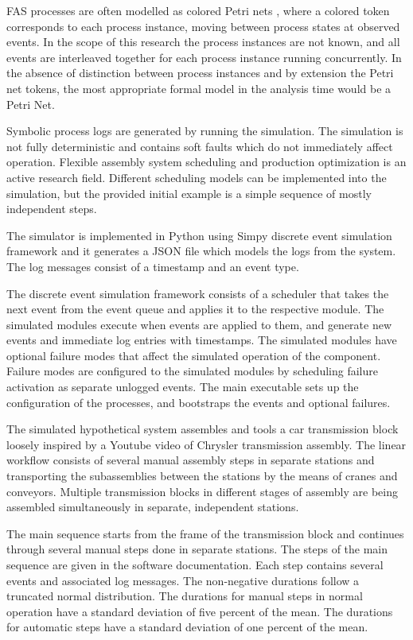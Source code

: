 \documentclass[procedia]{easychair}
\begin{document}
FAS processes are often modelled as colored Petri nets \cite{saitou2002robust}, where a colored token corresponds to each process instance, moving between process states at observed events.
In the scope of this research the process instances are not known, and all events are interleaved together for each process instance running concurrently. In the absence of distinction between process instances
and by extension the Petri net tokens, the most appropriate formal model in the analysis time would be a Petri Net.

Symbolic process logs are generated by running the simulation.
The simulation is not fully deterministic and contains soft faults which do not immediately affect operation.
Flexible assembly system scheduling and production optimization is an active research field. Different scheduling models can be implemented into the simulation,
but the provided initial example is a simple sequence of mostly independent steps.

The simulator is implemented in Python using Simpy discrete event simulation framework and it generates a JSON file which models the logs from the system.
The log messages consist of a timestamp and an event type.

The discrete event simulation framework consists of a scheduler that takes the next event from the event queue and applies it to the respective module. The simulated modules
execute when events are applied to them, and generate new events and immediate log entries with timestamps.
The simulated modules have optional failure modes that affect the simulated operation of the component. Failure modes are configured to the simulated modules
by scheduling failure activation as separate unlogged events.
The main executable sets up the configuration of the processes, and bootstraps the events and optional failures.

The simulated hypothetical system assembles and tools a car transmission block loosely inspired by a Youtube video of Chrysler transmission assembly\cite{transmission}.
The linear workflow consists of several manual assembly steps in separate stations and transporting the subassemblies between the stations by the means of
cranes and conveyors. Multiple transmission blocks in different stages of assembly are being assembled simultaneously in separate, independent stations.

The main sequence starts from the frame of the transmission block
and continues through several manual steps done in separate stations. The steps of the main sequence are given in the software documentation\cite{FASSimulator}.
Each step contains several events and associated log messages.
The non-negative durations follow a truncated normal distribution. The durations for manual steps in normal operation have a standard deviation of five percent of the mean. The durations for automatic steps
have a standard deviation of one percent of the mean.
\end{document}
